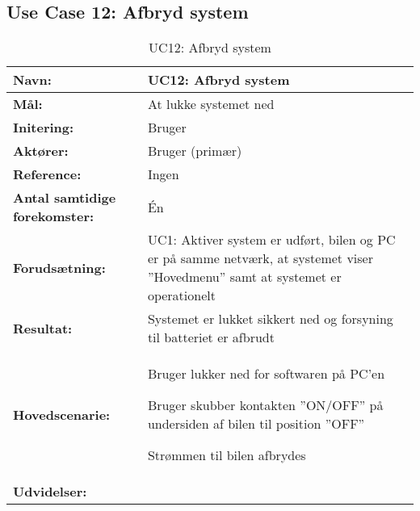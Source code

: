 \subsection{Use Case 12: Afbryd system}
\begin{table}[h]
\begin{tabularx}{\textwidth}{| >{\raggedright\arraybackslash}p{3.3 cm} | >{\raggedright\arraybackslash}X |} \hline

\textbf{Navn:} 						& UC12: Afbryd system\\ \hline
\textbf{Mål:}						& At lukke systemet ned \\ \hline
\textbf{Initering:}					& Bruger \\ \hline
\textbf{Aktører:} 					& Bruger (primær) \\ \hline
\textbf{Reference:} 				& Ingen \\ \hline
\textbf{Antal samtidige forekomster:} & Én \\ \hline
\textbf{Forudsætning:} 				& UC1: Aktiver system er udført, bilen og PC er på samme netværk, at systemet viser ''Hovedmenu'' samt at systemet er operationelt \\ \hline
\textbf{Resultat:}					& Systemet er lukket sikkert ned og forsyning til batteriet er afbrudt \\ \hline
\textbf{Hovedscenarie:}				& 

\begin{packed_enum}
\item Bruger lukker ned for softwaren på PC'en
\item Bruger skubber kontakten ''ON/OFF'' på undersiden af bilen til position ''OFF''
\item Strømmen til bilen afbrydes 
\end{packed_enum} \\ \hline
\textbf{Udvidelser:}				&  
\textbf{}
\\ \hline
\end{tabularx}
\caption{UC12: Afbryd system}
\label{tbl:UC12}
\end{table}